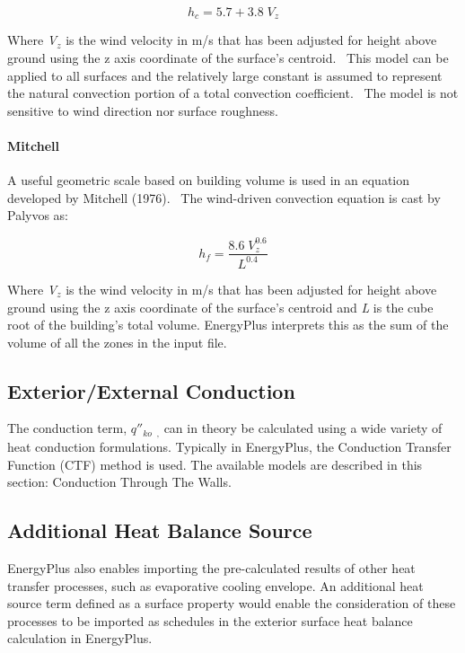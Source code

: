 \begin{equation}
{h_c} = 5.7 + 3.8\;{V_z}
\end{equation}

Where \emph{V\(_{z}\)} is the wind velocity in m/s that has been adjusted for height above ground using the z axis coordinate of the surface's centroid.~ This model can be applied to all surfaces and the relatively large constant is assumed to represent the natural convection portion of a total convection coefficient.~ The model is not sensitive to wind direction nor surface roughness.

\paragraph{Mitchell}\label{mitchell}

A useful geometric scale based on building volume is used in an equation developed by Mitchell (1976).~ The wind-driven convection equation is cast by Palyvos as:

\begin{equation}
{h_f} = \frac{{8.6\;V_z^{0.6}}}{{{L^{0.4}}}}
\end{equation}

Where \emph{V\(_{z}\)} is the wind velocity in m/s that has been adjusted for height above ground using the z axis coordinate of the surface's centroid and \emph{L} is the cube root of the building's total volume. EnergyPlus interprets this as the sum of the volume of all the zones in the input file.

\subsection{Exterior/External Conduction}\label{exteriorexternal-conduction}

The conduction term, \({q''_{ko}}\) \(_{,}\) can in theory be calculated using a wide variety of heat conduction formulations. Typically in EnergyPlus, the Conduction Transfer Function (CTF) method is used. The available models are described in this section: Conduction Through The Walls.

\subsection{Additional Heat Balance Source}\label{additonal-heat-balance-source}

EnergyPlus also enables importing the pre-calculated results of other heat transfer processes, such as evaporative cooling envelope. An additional heat source term defined as a surface property would enable the consideration of these processes to be imported as schedules in the exterior surface heat balance calculation in EnergyPlus.

